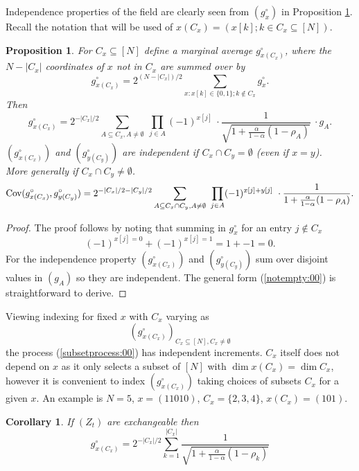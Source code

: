 \documentclass[preprint,11pt]{elsarticle}
\newtheorem{Corollary}{Corollary}
\newtheorem{Proposition}{Proposition}
\theoremstyle{remark}
\begin{document}
{Independence properties of the field are clearly seen from $(g^\circ_x)$ in Proposition \ref{prop:2}. Recall the notation that will be used of
$x(C_x) = (x[k];k \in C_x \subseteq [N])$.
\begin{Proposition}\label{prop:2}
For $C_x\subseteq [N]$ define a marginal average $g^\circ_{x(C_x)}
$, where the $N- |C_x|$ coordinates of $x$ not in $C_x$ are summed over by
\[
g^\circ_{x(C_x)}
= 2^{(N-|C_x|)/2}
\sum_{x:x[k] \in \{0,1\}; k \notin C_x}g^\circ_{x}.
\]
Then
\[
g^\circ_{x(C_x)}
=  2^{-|C_x|/2}
\sum_{A \subseteq C_x, A \ne \emptyset}\ \prod_{j\in A}(-1)^{{x}[j]}\ \cdot
\frac{1}{\sqrt{1 + \frac{\alpha}{1-\alpha}(1-\rho_A)}}\ \cdot
g_A.
\]
$(g^\circ_{x(C_x)})$ and $(g^\circ_{y(C_y)} )$ are independent if $C_x\cap C_y=\emptyset$ (even if $x=y$).\\
More generally if $C_x\cap C_y\ne\emptyset$.
\begin{equation}
\text{\rm Cov}(g^\circ_{x(C_x)},g^\circ_{y(C_y)}) 
=  2^{-|C_x|/2 - |C_y|/2 }
\sum_{A \subseteq C_x\cap C_y, A \ne \emptyset}\ \prod_{j\in A}(-1)^{x[j]+y[j]}\ \cdot
\frac{1}{1 + \frac{\alpha}{1-\alpha}(1-\rho_A)}.
\label{notempty:00}
\end{equation}
\end{Proposition}
\begin{proof}
The proof follows by noting that summing in $g_x^\circ$ for an entry $j \not\in C_x$
\[
(-1)^{x[j]=0} + (-1)^{x[j]=1} = 1 + -1 = 0.
\]
For the independence property $(g^\circ_{x(C_x)})$ and $(g^\circ_{y(C_y)} )$ sum over disjoint values in $(g_A)$ so they are independent. The general form (\ref{notempty:00}) is straightforward to derive.
\end{proof}
Viewing indexing for fixed $x$ with $C_x$ varying as
\begin{equation}
(g^\circ_{x(C_x)})_{ C_x \subseteq [N], C_x \ne \emptyset}
\label{subsetprocess:00}
\end{equation}
the process (\ref{subsetprocess:00}) has independent increments. $C_x$ itself does not depend on $x$ as it only selects a subset of $[N]$ with $\dim x(C_x) = \dim C_x$, however it is convenient to index 
$(g^\circ_{x(C_x)})$ taking  choices of subsets $C_x$ for a given $x$.
An example is $N=5$, $x=(11010)$, $C_x=\{2,3,4\}$, $x(C_x) = (101)$.
\begin{Corollary}\label{kspin:00}
If $(Z_t)$ are exchangeable then
\begin{equation}
g^\circ_{x(C_x)}
=  2^{-|C_x|/2}
\sum_{k=1}^{|C_x|}
\frac {1}{\sqrt { 1 + \frac{\alpha}{1-\alpha}(1-\rho_k)}}

\end{equation}
\end{Corollary}}
\end{document}
